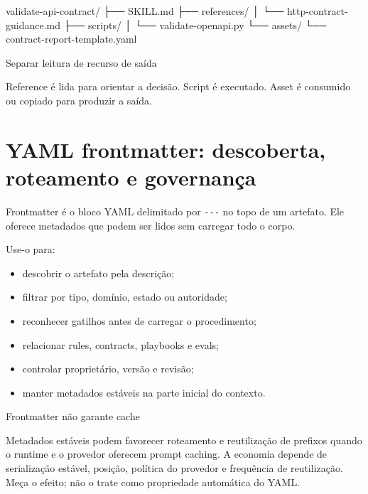 \documentclass[
  10pt,
  a4paper,
  oneside]{book}
\newenvironment{Shaded}{}{}
\newcommand{\NormalTok}[1]{#1}
\providecommand{\tightlist}{%
  \setlength{\itemsep}{0pt}\setlength{\parskip}{0pt}}
\begin{document}
\begin{Shaded}
\begin{Highlighting}[]
\NormalTok{validate{-}api{-}contract/}
\NormalTok{├── SKILL.md}
\NormalTok{├── references/}
\NormalTok{│   └── http{-}contract{-}guidance.md}
\NormalTok{├── scripts/}
\NormalTok{│   └── validate{-}openapi.py}
\NormalTok{└── assets/}
\NormalTok{    └── contract{-}report{-}template.yaml}
\end{Highlighting}
\end{Shaded}

\begin{tipbox}{Separar leitura de recurso de saída}

Reference é lida para orientar a decisão. Script é executado. Asset é
consumido ou copiado para produzir a saída.

\end{tipbox}

\hypertarget{yaml-frontmatter-descoberta-roteamento-e-governanuxe7a}{%
\section{YAML frontmatter: descoberta, roteamento e
governança}\label{yaml-frontmatter-descoberta-roteamento-e-governanuxe7a}}

Frontmatter é o bloco YAML delimitado por \texttt{-\/-\/-} no topo de um
artefato. Ele oferece metadados que podem ser lidos sem carregar todo o
corpo.

Use-o para:

\begin{itemize}
\tightlist
\item
  descobrir o artefato pela descrição;
\item
  filtrar por tipo, domínio, estado ou autoridade;
\item
  reconhecer gatilhos antes de carregar o procedimento;
\item
  relacionar rules, contracts, playbooks e evals;
\item
  controlar proprietário, versão e revisão;
\item
  manter metadados estáveis na parte inicial do contexto.
\end{itemize}

\begin{warningbox}{Frontmatter não garante cache}

Metadados estáveis podem favorecer roteamento e reutilização de prefixos
quando o runtime e o provedor oferecem prompt caching. A economia
depende de serialização estável, posição, política do provedor e
frequência de reutilização. Meça o efeito; não o trate como propriedade
automática do YAML.

\end{warningbox}
\end{document}
